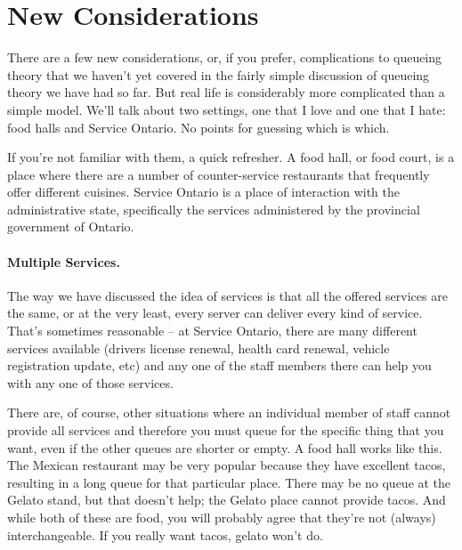




\section*{New Considerations}

There are a few new considerations, or, if you prefer, complications to queueing theory that we haven't yet covered in the fairly simple discussion of queueing theory we have had so far. But real life is considerably more complicated than a simple model. We'll talk about two settings, one that I love and one that I hate: food halls and Service Ontario. No points for guessing which is which.

If you're not familiar with them, a quick refresher. A food hall, or food court, is a place where there are a number of counter-service restaurants that frequently offer different cuisines. Service Ontario is a place of interaction with the administrative state, specifically the services administered by the provincial government of Ontario.

\paragraph{Multiple Services.} The way we have discussed the idea of services is that all the offered services are the same, or at the very least, every server can deliver every kind of service. That's sometimes reasonable -- at Service Ontario, there are many different services available (drivers license renewal, health card renewal, vehicle registration update, etc) and any one of the staff members there can help you with any one of those services.

There are, of course, other situations where an individual member of staff cannot provide all services and therefore you must queue for the specific thing that you want, even if the other queues are shorter or empty. A food hall works like this. The Mexican restaurant may be very popular because they have excellent tacos, resulting in a long queue for that particular place. There may be no queue at the Gelato stand, but that doesn't help; the Gelato place cannot provide tacos. And while both of these are food, you will probably agree that they're not (always) interchangeable. If you really want tacos, gelato won't do.

